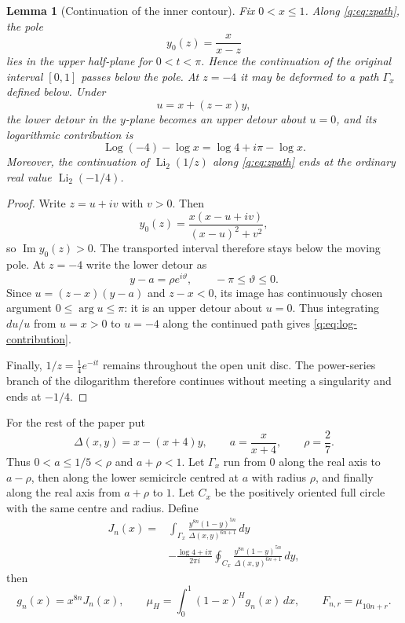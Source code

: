 \documentclass[11pt]{amsart}
\newcommand{\Li}{\operatorname{Li}}
\newcommand{\Log}{\operatorname{Log}}
\newcommand{\dd}{\,d}
\theoremstyle{plain}
\newtheorem{lemma}[theorem]{Lemma}
\theoremstyle{remark}\newtheorem{remark}[theorem]{Remark}
\numberwithin{equation}{section}
\begin{document}
\begin{lemma}[Continuation of the inner contour]\label{q:lem:continuation}
Fix $0<x\le1$.  Along \eqref{q:eq:zpath}, the pole
\[
 y_0(z)=\frac{x}{x-z}
\]
lies in the upper half-plane for $0<t<\pi$.  Hence the continuation of the
original interval $[0,1]$ passes below the pole.  At $z=-4$ it may be
deformed to a path $\Gamma_x$ defined below.  Under
\[
 u=x+(z-x)y,
\]
the lower detour in the $y$-plane becomes an upper detour about $u=0$, and
its logarithmic contribution is
\begin{equation}\label{q:eq:log-contribution}
  \Log(-4)-\log x=\log4+i\pi-\log x.
\end{equation}
Moreover, the continuation of $\Li_2(1/z)$ along \eqref{q:eq:zpath} ends at the
ordinary real value $\Li_2(-1/4)$.
\end{lemma}

\begin{proof}
Write $z=u+iv$ with $v>0$.  Then
\[
 y_0(z)=\frac{x(x-u+iv)}{(x-u)^2+v^2},
\]
so $\operatorname{Im}y_0(z)>0$.  The transported interval therefore stays
below the moving pole.  At $z=-4$ write the lower detour as
\[
 y-a=\rho e^{i\vartheta},\qquad -\pi\le\vartheta\le0.
\]
Since $u=(z-x)(y-a)$ and $z-x<0$, its image has continuously chosen
argument $0\le\arg u\le\pi$: it is an upper detour about $u=0$.
Thus integrating $du/u$ from $u=x>0$ to $u=-4$ along the continued path
gives \eqref{q:eq:log-contribution}.

Finally, $1/z=\frac14e^{-it}$ remains throughout the open unit disc.  The
power-series branch of the dilogarithm therefore continues without meeting a
singularity and ends at $-1/4$.
\end{proof}

For the rest of the paper put
\begin{equation}\label{q:eq:delta-a-rho}
 \Delta(x,y)=x-(x+4)y,\qquad
 a=\frac{x}{x+4},\qquad
 \rho=\frac27.
\end{equation}
Thus $0<a\le1/5<\rho$ and $a+\rho<1$.  Let $\Gamma_x$ run from $0$ along the
real axis to $a-\rho$, then along the lower semicircle centred at $a$ with
radius $\rho$, and finally along the real axis from $a+\rho$ to $1$.  Let
$C_x$ be the positively oriented full circle with the same centre and radius.
Define
\begin{equation}\label{q:eq:Jdef}
\begin{split}
 J_n(x)={}&\int_{\Gamma_x}
  \frac{y^{8n}(1-y)^{5n}}{\Delta(x,y)^{6n+1}}\dd y\\
 &-\frac{\log4+i\pi}{2\pi i}
  \oint_{C_x}\frac{y^{8n}(1-y)^{5n}}
  {\Delta(x,y)^{6n+1}}\dd y,
\end{split}
\end{equation}
then
\begin{equation}\label{q:eq:g-mu-F}
 g_n(x)=x^{8n}J_n(x),\qquad
 \mu_H=\int_0^1(1-x)^H g_n(x)\dd x,
 \qquad
 F_{n,r}=\mu_{10n+r}.
\end{equation}
\end{document}
